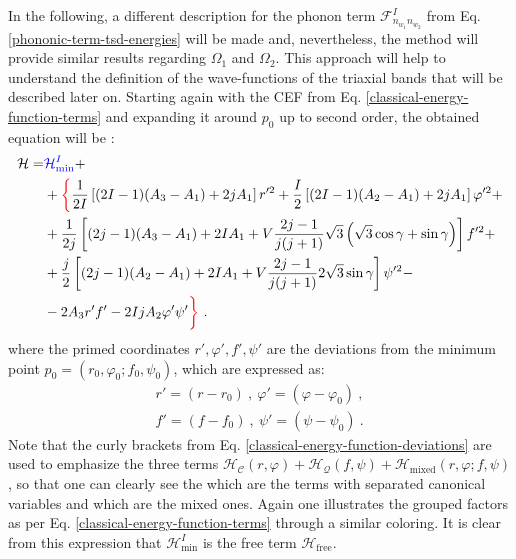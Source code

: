 In the following, a different description for the phonon term $\mathcal{F}_{n_{w_1}n_{w_2}}^I$ from Eq. \ref{phononic-term-tsd-energies} will be made and, nevertheless, the method will provide similar results regarding $\Omega_1$ and $\Omega_2$. This approach will help to understand the definition of the wave-functions of the triaxial bands that will be described later on. Starting again with the CEF from Eq. \ref{classical-energy-function-terms} and expanding it around $p_0$ up to second order, the obtained equation will be \cite{raduta2020approach}:
\begin{align}
    \mathcal{H}=&{\color{blue}\mathcal{H}_\text{min}^I}+\nonumber\\
                &+{\color{red}\bigg\{}\frac{1}{2I}\left[(2I-1)(A_3-A_1)+2jA_1\right]r'^{2}+\frac{I}{2}\left[(2I-1)(A_2-A_1)+2jA_1\right]\varphi'^2+\nonumber\\
                &+\frac{1}{2j}\left[(2j-1)(A_3-A_1)+2IA_1+V\frac{2j-1}{j(j+1)}\sqrt{3}\left(\sqrt{3}\cos\gamma+\sin\gamma\right)\right]f'^2+\nonumber\\
                &+\frac{j}{2}\left[(2j-1)(A_2-A_1)+2IA_1+V\frac{2j-1}{j(j+1)}2\sqrt{3}\sin\gamma\right]\psi'^2-\nonumber\\
                &-2A_3r'f'-2IjA_2\varphi'\psi'{\color{red}\bigg\}}\ .
    \label{classical-energy-function-deviations}
\end{align}
where the primed coordinates $r',\varphi',f',\psi'$ are the deviations from the minimum point $p_0=(r_0,\varphi_0;f_0,\psi_0)$, which are expressed as:
\begin{align}
    r'=(r-r_0)\ ,\ \varphi'=(\varphi-\varphi_0)\ ,\nonumber\\
    f'=(f-f_0)\ ,\ \psi'=(\psi-\psi_0)\ .
\end{align}
Note that the curly brackets from Eq. \ref{classical-energy-function-deviations} are used to emphasize the three terms $\mathcal{H}_\mathscr{C}(r,\varphi)+\mathcal{H}_\mathcal{Q}(f,\psi)+\mathcal{H}_\text{mixed}(r,\varphi;f,\psi)$, so that one can clearly see the which are the terms with separated canonical variables and which are the mixed ones. Again one illustrates the grouped factors as per Eq. \ref{classical-energy-function-terms} through a similar coloring. It is clear from this expression that $\mathcal{H}_\text{min}^I$ is the free term $\mathcal{H}_\text{free}$.

